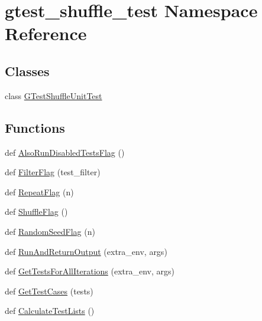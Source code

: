 \hypertarget{namespacegtest__shuffle__test}{}\section{gtest\+\_\+shuffle\+\_\+test Namespace Reference}
\label{namespacegtest__shuffle__test}
\subsection*{Classes}
\begin{DoxyCompactItemize}
\item 
class \hyperlink{classgtest__shuffle__test_1_1_g_test_shuffle_unit_test}{G\+Test\+Shuffle\+Unit\+Test}
\end{DoxyCompactItemize}
\subsection*{Functions}
\begin{DoxyCompactItemize}
\item 
def \hyperlink{namespacegtest__shuffle__test_a91033ae962b37f040a95fb90062aacb3}{Also\+Run\+Disabled\+Tests\+Flag} ()
\item 
def \hyperlink{namespacegtest__shuffle__test_aa849ecba21a2796be477040bd303b700}{Filter\+Flag} (test\+\_\+filter)
\item 
def \hyperlink{namespacegtest__shuffle__test_a193f6cd2eeb35e7925dca6d8f72f75d3}{Repeat\+Flag} (n)
\item 
def \hyperlink{namespacegtest__shuffle__test_ab593e060bf2a9b2f0cb0dc8e18eb2088}{Shuffle\+Flag} ()
\item 
def \hyperlink{namespacegtest__shuffle__test_aaf2a94c748f266c4267ac7e7bb3451fd}{Random\+Seed\+Flag} (n)
\item 
def \hyperlink{namespacegtest__shuffle__test_afbe879c2b3fdfed12b777b813359dbd4}{Run\+And\+Return\+Output} (extra\+\_\+env, args)
\item 
def \hyperlink{namespacegtest__shuffle__test_a18c7606bf0d41acb73a4a6a2994d36fc}{Get\+Tests\+For\+All\+Iterations} (extra\+\_\+env, args)
\item 
def \hyperlink{namespacegtest__shuffle__test_af5328e9cbee0e357d6abf16255df13f7}{Get\+Test\+Cases} (tests)
\item 
def \hyperlink{namespacegtest__shuffle__test_a51dcc55df3ebd76c676298ef9b4fea19}{Calculate\+Test\+Lists} ()
\end{DoxyCompactItemize}
